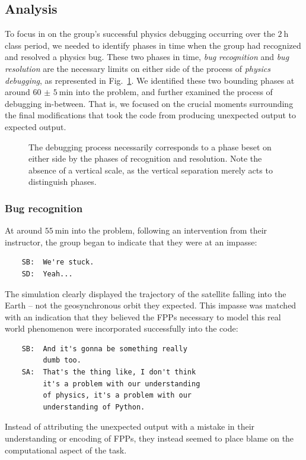 \documentclass{msuphddissertation}
\begin{document}
\begin{doublespace}
\subsection{Analysis}

To focus in on the group's successful physics debugging occurring over the $\SI{2}{\hour}$ class period, we needed to identify phases in time when the group had recognized and resolved a physics bug.  These two phases in time, \emph{bug recognition} and \emph{bug resolution} are the necessary limits on either side of the process of \emph{physics debugging}, as represented in Fig.~\ref{phases}.  We identified these two bounding phases at around $\SI{60(5)}{\minute}$ into the problem, and further examined the process of debugging in-between.  That is, we focused on the crucial moments surrounding the final modifications that took the code from producing unexpected output to expected output.

\begin{figure}
\caption{The debugging process necessarily corresponds to a phase beset on either side by the phases of recognition and resolution.  Note the absence of a vertical scale, as the vertical separation merely acts to distinguish phases.}
\label{phases}
\end{figure}

\subsubsection{Bug recognition}

At around $\SI{55}{\minute}$ into the problem, following an intervention from their instructor, the group began to indicate that they were at an impasse:  \begin{verbatim}
    SB:  We're stuck.
    SD:  Yeah...
\end{verbatim}  The simulation clearly displayed the trajectory of the satellite falling into the Earth -- not the geosynchronous orbit they expected.  This impasse was matched with an indication that they believed the FPPs necessary to model this real world phenomenon were incorporated successfully into the code:  \begin{verbatim}
    SB:  And it's gonna be something really
         dumb too.
    SA:  That's the thing like, I don't think
         it's a problem with our understanding
         of physics, it's a problem with our
         understanding of Python.
\end{verbatim}  Instead of attributing the unexpected output with a mistake in their understanding or encoding of FPPs, they instead seemed to place blame on the computational aspect of the task.


\end{doublespace}
\end{document}
